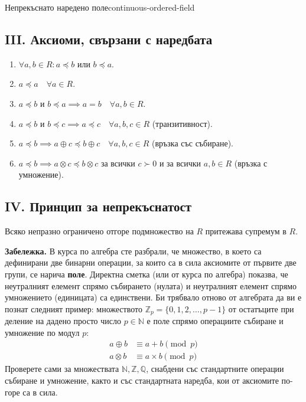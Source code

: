 \begin{definition}{Непрекъснато наредено поле}{continuous-ordered-field}
\subsection*{III. Аксиоми, свързани с наредбата}
\begin{enumerate}
    \item $\forall a, b \in R : a \preccurlyeq b \text{ или } b \preccurlyeq a$.
    \item $a \preccurlyeq a \quad \forall a \in R$.
    \item $a \preccurlyeq b \text{ и } b \preccurlyeq a \implies a = b \quad \forall a, b \in R$.
    \item $a \preccurlyeq b \text{ и } b \preccurlyeq c \implies a \preccurlyeq c \quad \forall a, b, c \in R$ (транзитивност).
    \item $a \preccurlyeq b \implies a \oplus c \preccurlyeq b \oplus c \quad \forall a, b, c \in R$ (връзка със събиране).
    \item $a \preccurlyeq b \implies a \otimes c \preccurlyeq b \otimes c$ за всички $c \succ 0$ и за всички $a, b \in R$ (връзка с умножение).
\end{enumerate}

\subsection*{IV. Принцип за непрекъснатост}
Всяко непразно ограничено отгоре подмножество на $R$ притежава супремум в $R$.
\end{definition}

\noindent\textbf{Забележка.} В курса по алгебра сте разбрали, че множество, в което са дефинирани две бинарни операции, за които са в сила аксиомите от първите две групи, се нарича \textbf{поле}. Директна сметка (или от курса по алгебра) показва, че неутралният елемент спрямо събирането (нулата) и неутралният елемент спрямо умножението (единицата) са единствени. Би трябвало отново от алгебрата да ви е познат следният пример: множеството $\mathbb{Z}_p = \{0, 1, 2, \dots, p - 1\}$ от остатъците при деление на дадено просто число $p \in \mathbb{N}$ е поле спрямо операциите събиране и умножение по модул $p$:
\begin{align*}
    a \oplus b &\equiv a + b \pmod p \\
    a \otimes b &\equiv a \times b \pmod p
\end{align*}
Проверете сами за множествата $\mathbb{N}, \mathbb{Z}, \mathbb{Q}$, снабдени със стандартните операции събиране и умножение, както и със стандартната наредба, кои от аксиомите по-горе са в сила.

